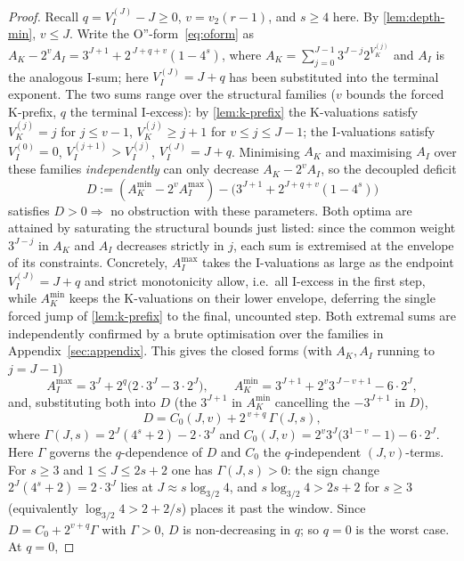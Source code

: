 \documentclass[11pt,reqno]{amsart}
\newcommand{\Vk}{V_{K}}
\newcommand{\Vi}{V_{I}}
\newcommand{\vtwo}{v_{2}}
\begin{document}
\begin{proof}
Recall $q = \Vi^{(J)} - J \ge 0$, $v = \vtwo(r-1)$, and $s \ge 4$ here.
By \cref{lem:depth-min}, $v \le J$. Write the O''-form~\eqref{eq:oform} as
$A_K - 2^{v} A_I = 3^{J+1} + 2^{\,J+q+v}(1 - 4^{s})$, where
$A_K = \sum_{j=0}^{J-1} 3^{J-j} 2^{\Vk^{(j)}}$ and $A_I$ is the analogous I-sum;
here $\Vi^{(J)} = J + q$ has been substituted into the terminal exponent. The
two sums range over the structural families ($v$ bounds the forced K-prefix,
$q$ the terminal I-excess): by
\cref{lem:k-prefix} the K-valuations satisfy $\Vk^{(j)} = j$ for $j \le v-1$,
$\Vk^{(j)} \ge j+1$ for $v \le j \le J-1$; the I-valuations satisfy
$\Vi^{(0)} = 0$, $\Vi^{(j+1)} > \Vi^{(j)}$, $\Vi^{(J)} = J+q$. Minimising $A_K$ and
maximising $A_I$ over these families \emph{independently} can only decrease
$A_K - 2^{v} A_I$, so the decoupled deficit
\[
D := (A_K^{\min} - 2^{v} A_I^{\max}) - \bigl(3^{J+1} + 2^{J+q+v}(1-4^{s})\bigr)
\]
satisfies $D > 0 \Rightarrow$ no obstruction with these parameters. Both optima
are attained by saturating the structural bounds just listed: since the common
weight $3^{J-j}$ in $A_K$ and $A_I$ decreases strictly in $j$, each sum is
extremised at the envelope of its constraints. Concretely, $A_I^{\max}$ takes the I-valuations as large as the endpoint
$\Vi^{(J)} = J+q$ and strict monotonicity allow, i.e.\ all I-excess in the first
step, while $A_K^{\min}$ keeps the K-valuations on their lower envelope,
deferring the single forced jump of \cref{lem:k-prefix} to the final, uncounted
step. Both extremal sums
are independently confirmed by a brute optimisation over the families in
Appendix~\ref{sec:appendix}. This gives the closed forms (with $A_K, A_I$
running to $j = J-1$)
\[
A_I^{\max} = 3^{J} + 2^{q}\bigl(2\cdot 3^{J} - 3\cdot 2^{J}\bigr),
\qquad
A_K^{\min} = 3^{J+1} + 2^{v} 3^{\,J-v+1} - 6\cdot 2^{J},
\]
and, substituting both into $D$ (the $3^{J+1}$ in $A_K^{\min}$ cancelling the
$-3^{J+1}$ in $D$),
\[
D = C_0(J,v) + 2^{\,v+q}\,\Gamma(J,s),
\]
where $\Gamma(J,s) = 2^{J}(4^{s}+2) - 2\cdot 3^{J}$ and
$C_0(J,v) = 2^{v} 3^{J}\bigl(3^{1-v}-1\bigr) - 6\cdot 2^{J}$. Here $\Gamma$
governs the $q$-dependence of $D$ and $C_0$ the $q$-independent $(J,v)$-terms.
For $s \ge 3$ and $1 \le J \le 2s+2$ one has $\Gamma(J,s) > 0$: the sign
change $2^{J}(4^{s}+2) = 2\cdot 3^{J}$ lies at $J \approx s\log_{3/2}4$, and
$s\log_{3/2}4 > 2s+2$ for $s \ge 3$ (equivalently $\log_{3/2}4 > 2 + 2/s$)
places it past the window. Since
$D = C_0 + 2^{v+q}\Gamma$ with $\Gamma > 0$, $D$ is non-decreasing in $q$; so
$q = 0$ is the worst case. At $q = 0$,

\end{proof}
\end{document}
